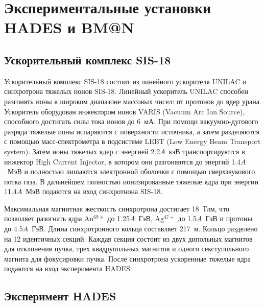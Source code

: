 \chapter{Экспериментальные установки HADES и BM@N} \label{chapt2}


\section{Ускорительный комплекс SIS-18}

Ускорительный комплекс SIS-18 состоит из линейного ускорителя UNILAC и синхротрона тяжелых ионов SIS-18.
Линейный ускоритель UNILAC способен разгонять ионы в широком диапазоне массовых чисел: от протонов до ядер урана.
Ускоритель оборудован инжектором ионов VARIS (Vacuum Arc Ion Source), способного достигать силы тока ионов до 6~мА.
При помощи вакуумно-дугового разряда тяжелые ионы испаряются с поверхности источника, а затем разделяются с помощью масс-спектрометра в подсистеме LEBT (Low Energy Beam Transport system).
Затем ионы тяжелых ядер с энергией 2.2$A$~кэВ транспортируются в инжектор High Current Injector, в котором они разгоняются до энергий 1.4$A$~МэВ и полностью лишаются электронной оболочки с помощью сверхзвукового потка газа.
В дальнейшем полностью ионизированные тяжелые ядра при энергии 11.4$A$~МэВ подаются на вход синхротнона SIS-18.

Максимальная магнитная жесткость синхротрона достигает 18~Тлм, что позволяет разогнать ядра Au$^{69+}$ до 1.25$A$~ГэВ, Ag$^{47+}$ до 1.5$A$~ГэВ и протоны до 4.5$A$~ГэВ.
Длина синхротронного кольца составляет 217~м.
Кольцо разделено на 12 идентичных секций.
Каждая секция состоит из двух дипольных магнитов для отклонения пучка, трех квадрупольных магнитов и одного секступольного магнита для фокусировки пучка.
После синхротрона ускоренные тяжелые ядра подаются на вход эксперимента HADES.

\section{Эксперимент HADES}

